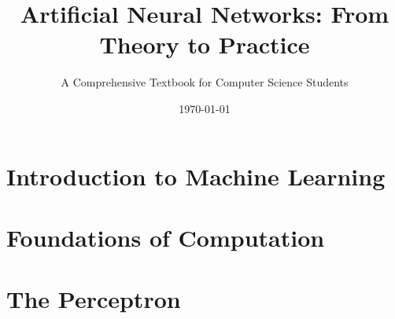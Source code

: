 \documentclass{book}
\title{Artificial Neural Networks: From Theory to Practice}
\author{A Comprehensive Textbook for Computer Science Students}
\date{\today}
\begin{document}
\maketitle
\tableofcontents

\chapter{Introduction to Machine Learning}


\chapter{Foundations of Computation}


\chapter{The Perceptron}

\end{document}
